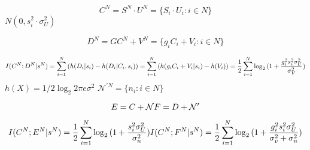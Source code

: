 \begin{equation}
C^N= S^N \cdot U^N = \{ S_i\cdot U_i : i \in N \}
\end{equation}
$N(0, s_i^2 \cdot \sigma^2_U)$

\begin{equation}
D^N= GC^N + V^N = \{ g_i C_i + V_i : i \in N \}
\end{equation}

\begin{equation}
I(C^N; D^N|s^N)  = \sum_{i=1}^N{(h(D_i|s_i)-h(D_i|C_i,s_i))} \\
= \sum_{i=1}^N{(h( g_i C_i + V_i|s_i)-h(V_i))} \\
= \frac{1}{2}\sum_{i=1}^N{\log_2{(1+\frac{g_i^2s_i^2\sigma^2_U}{\sigma^2_V})}}
\end{equation}
$h(X)=1/2\log_2{2\pi e \sigma^2}$
$\mathcal{N}^{\prime N} = \{ n_i : i \in N \} $

\begin{equation}
E = C + \mathcal{N}\\
F = D + \mathcal{N}^{\prime }
\end{equation}

\begin{equation}
I(C^N; E^N|s^N)  = \frac{1}{2}\sum_{i=1}^N{\log_2{(1+\frac{s_i^2\sigma^2_U}{\sigma^2_n})}}\\
I(C^N; F^N|s^N)  = \frac{1}{2}\sum_{i=1}^N{\log_2{(1+\frac{g_i^2s_i^2\sigma^2_U}{\sigma^2_v+\sigma^2_n})}}
\end{equation}
